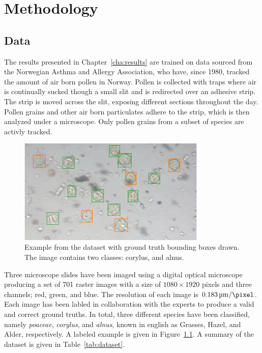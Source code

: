 \chapter{Methodology}\label{cha:method}

\section{Data}\label{sec:dataset}
The results presented in Chapter~\ref{cha:results} are trained on data sourced from the Norwegian Asthma and Allergy Association, who have, since 1980, tracked the amount of air born pollen in Norway.
Pollen is collected with traps where air is continually sucked though a small slit and is redirected over an adhesive strip.
The strip is moved across the slit, exposing different sections throughout the day.
Pollen grains and other air born particulates adhere to the strip, which is then analyzed under a microscope.
Only pollen grains from a subset of species are activly tracked.

\begin{figure}[htbp]
  \centering
  \includegraphics[width=0.8\textwidth]{figs/Snap-057.png}
  \caption[Dataset example]{Example from the dataset with ground truth bounding boxes drawn. The image contains two classes: \textcolor{corylus}{corylus}, and \textcolor{alnus}{alnus}.}\label{fig:dataset-sample}
\end{figure}

Three microscope slides have been imaged using a digital optical microscope producing a set of 701 raster images with a size of \(1080\times 1920\) pixels and three channels; red, green, and blue.
The resolution of each image is \(\SI{0.183}{\micro\metre\per\pixel}\).
Each image has been labled in collaboration with the experts to produce a valid and correct ground truths.
In total, three different species have been classified, namely \textit{poaceae}, \textit{corylus}, and \textit{alnus}, known in english as Grasses, Hazel, and Alder, respectively. A labeled example is given in Figure~\ref{fig:dataset-sample}. A summary of the dataset is given in Table~\ref{tab:dataset}.

